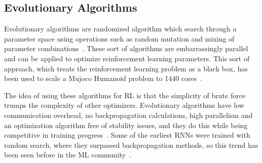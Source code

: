 \subsection{Evolutionary Algorithms}

Evolutionary algorithms are randomized algorithm which search through a
parameter space using operations such as random mutation and mixing of
parameter combinations~\cite{man1996genetic}. These sort of algorithms are
embarrassingly parallel and can be applied to optimize reinforcement learning
parameters. This sort of approach, which treats the reinforcement learning
problem as a black box, has been used to scale a Mujoco Humanoid problem to
1440 cores~\cite{salimans2017evolution}.

The idea of using these algorithms for RL is that the simplicity of brute
force trumps the complexity of other optimizers. Evolutionary algorithms have
low communication overhead, no backpropagation calculations, high parallelism
and an optimization algorithm free of stability issues, and they do this while
being competitive in training progress~\cite{salimans2017evolution}. Some of
the earliest RNNs were trained with random search, where they surpassed
backpropagation methods, so this trend has been seen before in the ML
community~\cite{hochreiter1997long}.

